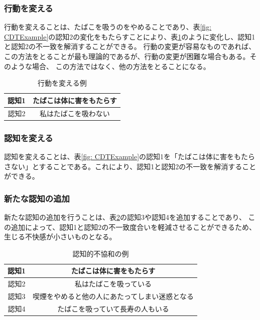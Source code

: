 \documentclass[11pt,a4j]{jreport}
\begin{document}
\subsubsection{行動を変える}
行動を変えることは、たばこを吸うのをやめることであり、表\ref{fig: CDTExample}の認知2の変化をもたらすことにより、表\ref{fig: ReduceDissonanceAction}のように変化し、認知1と認知2の不一致を解消することができる。
行動の変更が容易なものであれば、この方法をとることが最も理論的であるが、行動の変更が困難な場合もある。そのような場合、
この方法ではなく、他の方法をとることになる。
\begin{table}[h]
  \centering
  
  \label{fig: ReduceDissonanceAction}
  \begin{tabular}{c|c}

      認知1 & たばこは体に害をもたらす  \\ \hline
      認知2 & 私はたばこを吸わない \\
  \end{tabular}
  \caption{行動を変える例}

\end{table}

\subsubsection{認知を変える}
認知を変えることは、表\ref{fig: CDTExample}の認知1を「たばこは体に害をもたらさない」とすることである。これにより、認知1と認知2の不一致を解消することができる。
\subsubsection{新たな認知の追加}
新たな認知の追加を行うことは、表\ref{fig: CDTExample2}の認知3や認知4を追加することであり、
この追加によって、認知1と認知2の不一致度合いを軽減させることができるため、生じる不快感が小さいものとなる。
\begin{table}[h]
  \centering
  
  \label{fig: CDTExample2}
  \begin{tabular}{c|c}

      認知1 & たばこは体に害をもたらす  \\ \hline
      認知2 & 私はたばこを吸っている \\ \hline
      認知3 & 喫煙をやめると他の人にあたってしまい迷惑となる \\ \hline
      認知4 & たばこを吸っていて長寿の人もいる \\ 
  \end{tabular}
  \caption{認知的不協和の例}
\end{table}
\end{document}
